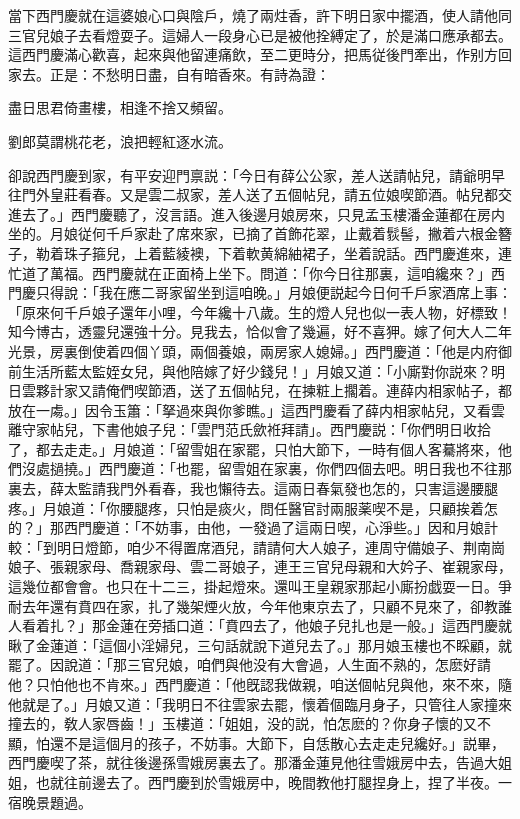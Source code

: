 當下西門慶就在這婆娘心口與陰戶，燒了兩炷香，許下明日家中擺酒，使人請他同三官兒娘子去看燈耍子。這婦人一段身心已是被他拴縛定了，於是滿口應承都去。這西門慶滿心歡喜，起來與他留連痛飲，至二更時分，把馬従後門牽出，作别方回家去。正是：不愁明日盡，自有暗香來。有詩為證：

\begin{myquote}
盡日思君倚畫樓，相逢不捨又頻留。

劉郎莫謂桃花老，浪把輕紅逐水流。
\end{myquote}

卻說西門慶到家，有平安迎門禀説：「今日有薛公公家，差人送請帖兒，請爺明早往門外皇莊看春。又是雲二叔家，差人送了五個帖兒，請五位娘喫節酒。帖兒都交進去了。」西門慶聽了，沒言語。進入後邊月娘房來，只見孟玉樓潘金蓮都在房内坐的。月娘従何千戶家赴了席來家，已摘了首飾花翠，止戴着䯼髻，撇着六根金簪子，勒着珠子箍兒，上着藍綾襖，下着軟黄綿紬裙子，坐着說話。西門慶進來，連忙道了萬福。西門慶就在正面椅上坐下。問道：「你今日往那裏，這咱纔來？」西門慶只得說：「我在應二哥家留坐到這咱晚。」月娘便説起今日何千戶家酒席上事：「原來何千戶娘子還年小哩，今年纔十八歲。生的燈人兒也似一表人物，好標致！知今博古，透靈兒還強十分。見我去，恰似會了幾遍，好不喜狎。嫁了何大人二年光景，房裏倒使着四個丫頭，兩個養娘，兩房家人媳婦。」西門慶道：「他是内府御前生活所藍太監姪女兒，與他陪嫁了好少錢兒！」月娘又道：「小廝對你説來？明日雲夥計家又請俺們喫節酒，送了五個帖兒，在揀粧上擱着。連薛内相家帖子，都放在一䖏。」因令玉簫：「拏過來與你爹瞧。」這西門慶看了薛内相家帖兒，又看雲離守家帖兒，下書他娘子兒：「雲門范氏歛袵拜請」。西門慶説：「你們明日收拾了，都去走走。」月娘道：「留雪姐在家罷，只怕大節下，一時有個人客驀將來，他們沒處撾撓。」西門慶道：「也罷，留雪姐在家裏，你們四個去吧。明日我也不往那裏去，薛太監請我門外看春，我也懶待去。這兩日春氣發也怎的，只害這邊腰腿疼。」月娘道：「你腰腿疼，只怕是痰火，問任醫官討兩服薬喫不是，只顧挨着怎的？」那西門慶道：「不妨事，由他，一發過了這兩日喫，心淨些。」因和月娘計較：「到明日燈節，咱少不得置席酒兒，請請何大人娘子，連周守備娘子、荆南崗娘子、張親家母、喬親家母、雲二哥娘子，連王三官兒母親和大妗子、崔親家母，這幾位都會會。也只在十二三，掛起燈來。還叫王皇親家那起小廝扮戯耍一日。爭耐去年還有賁四在家，扎了幾架煙火放，今年他東京去了，只顧不見來了，卻教誰人看着扎？」那金蓮在旁插口道：「賁四去了，他娘子兒扎也是一般。」這西門慶就瞅了金蓮道：「這個小淫婦兒，三句話就說下道兒去了。」那月娘玉樓也不睬顧，就罷了。因說道：「那三官兒娘，咱們與他没有大會過，人生面不熟的，怎麽好請他？只怕他也不肯來。」西門慶道：「他旣認我做親，咱送個帖兒與他，來不來，隨他就是了。」月娘又道：「我明日不往雲家去罷，懷着個臨月身子，只管往人家撞來撞去的，敎人家唇齒！」玉樓道：「姐姐，没的説，怕怎麽的？你身子懷的又不顯，怕還不是這個月的孩子，不妨事。大節下，自恁散心去走走兒纔好。」説畢，西門慶喫了茶，就往後邊孫雪娥房裏去了。那潘金蓮見他往雪娥房中去，告過大姐姐，也就往前邊去了。西門慶到於雪娥房中，晚間教他打腿捏身上，捏了半夜。一宿晚景題過。

